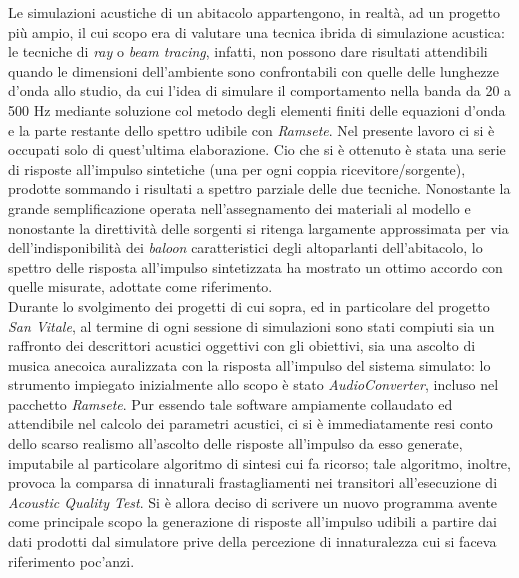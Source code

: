 \documentclass[10pt,a4paper]{article}
\begin{document}
%
Le simulazioni acustiche di un abitacolo appartengono, in realt\`a, ad un progetto pi\`u ampio, il cui scopo
era di valutare una tecnica ibrida di simulazione acustica: le tecniche di \emph{ray} o \emph{beam tracing},
infatti, non possono dare risultati attendibili quando le dimensioni dell'ambiente sono confrontabili con
quelle delle lunghezze d'onda allo studio, da cui l'idea di simulare il comportamento nella banda da 
20 a 500 Hz mediante soluzione
col metodo degli elementi finiti delle equazioni d'onda e la parte restante dello spettro udibile con
\emph{Ramsete}. Nel presente lavoro ci si \`e occupati solo di quest'ultima elaborazione. Cio che si \`e
ottenuto \`e stata una serie di risposte all'impulso sintetiche (una per ogni coppia ricevitore/sorgente), 
prodotte sommando i risultati a spettro parziale delle due tecniche. Nonostante la grande semplificazione
operata nell'assegnamento dei materiali al modello e nonostante la direttivit\`a delle sorgenti si ritenga
largamente approssimata per via dell'indisponibilit\`a dei \emph{baloon} caratteristici degli altoparlanti 
dell'abitacolo, lo spettro delle risposta all'impulso sintetizzata ha mostrato un ottimo accordo con
quelle misurate, adottate come riferimento.\\
Durante lo svolgimento dei progetti di cui sopra, ed in particolare del progetto \emph{San Vitale}, al
termine di ogni sessione di simulazioni sono stati compiuti sia un raffronto dei descrittori acustici
oggettivi con gli obiettivi, sia una ascolto di musica anecoica auralizzata con la risposta all'impulso
del sistema simulato: lo strumento impiegato inizialmente allo scopo \`e stato \emph{AudioConverter},
incluso nel pacchetto \emph{Ramsete}. Pur essendo tale software ampiamente collaudato ed attendibile nel
calcolo dei parametri acustici, ci si \`e immediatamente resi conto dello scarso realismo all'ascolto delle
risposte all'impulso da esso generate, imputabile al particolare algoritmo di sintesi cui fa ricorso;
tale algoritmo, inoltre, provoca la comparsa di innaturali frastagliamenti nei transitori all'esecuzione di 
\emph{Acoustic Quality Test}. Si \`e allora deciso di scrivere un nuovo programma avente come principale
scopo la generazione di risposte all'impulso udibili a partire dai dati prodotti dal simulatore
prive della percezione di innaturalezza cui si faceva riferimento poc'anzi.
\end{document}
